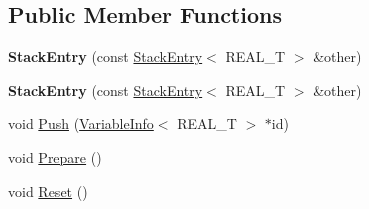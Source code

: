 \subsection*{Public Member Functions}
\begin{DoxyCompactItemize}
\item 
\hypertarget{structatl_1_1_stack_entry_a52c0538f3015b76293ea30b70e17db83}{{\bfseries Stack\+Entry} (const \hyperlink{structatl_1_1_stack_entry}{Stack\+Entry}$<$ R\+E\+A\+L\+\_\+\+T $>$ \&other)}\label{structatl_1_1_stack_entry_a52c0538f3015b76293ea30b70e17db83}

\item 
\hypertarget{structatl_1_1_stack_entry_a52c0538f3015b76293ea30b70e17db83}{{\bfseries Stack\+Entry} (const \hyperlink{structatl_1_1_stack_entry}{Stack\+Entry}$<$ R\+E\+A\+L\+\_\+\+T $>$ \&other)}\label{structatl_1_1_stack_entry_a52c0538f3015b76293ea30b70e17db83}

\item 
void \hyperlink{structatl_1_1_stack_entry_a0415bc91dd9e863fb4dd3f7b4d9b05d9}{Push} (\hyperlink{structatl_1_1_variable_info}{Variable\+Info}$<$ R\+E\+A\+L\+\_\+\+T $>$ $\ast$id)
\item 
void \hyperlink{structatl_1_1_stack_entry_a362647e782982e9acd1117d7f5ce4331}{Prepare} ()
\item 
void \hyperlink{structatl_1_1_stack_entry_a47e6f692a3a508a721f87af9797fc15c}{Reset} ()
\end{DoxyCompactItemize}
